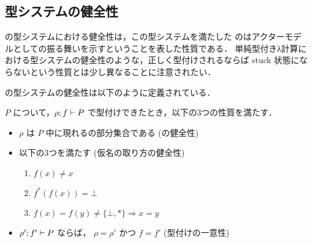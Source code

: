 




\subsection{型システムの健全性}

\api の型システムにおける健全性は，この型システムを満たした \api の\conf はアクターモデルとしての振る舞いを示すということを表した性質である．
単純型付きλ計算における型システムの健全性のような，正しく型付けされるならば stuck 状態にならないという性質とは少し異なることに注意されたい．

\api の型システムの健全性は以下のように定義されている．

\begin{thm}
  \conf $P$ について，$\rho ; f \vdash P$ で型付けできたとき，{\rm 以下の3つの性質を満たす．}

  \begin{itemize}
  \item
    $\rho$ は $P$ 中に現れる\free の部分集合である {\rm (\recep の健全性)}
  \item
   {\rm  以下の3つを満たす (仮名の取り方の健全性)}
    \begin{enumerate}
      \item $ f(x) \neq x $
      \item $ f^{*}(f(x)) = \bot $
      \item $ f(x) = f(y) \neq \{\bot, \ast\} \Rightarrow x = y $
    \end{enumerate}
  \item
    $\rho' ; f' \vdash P$ ならば， $\rho = \rho'$ かつ $f = f'$ {\rm (型付けの一意性)}
  \end{itemize}
\end{thm}

